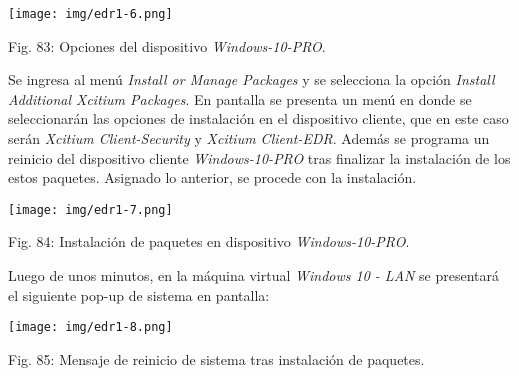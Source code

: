\documentclass[12pt,oneside,a4paper]{book}
\begin{document}
\vspace{2em}

\begin{center}
    \texttt{[image: img/edr1-6.png]}
    
\vspace{0.1em}
    
    Fig. 83: Opciones del dispositivo \textit{Windows-10-PRO}.
\end{center}

\vspace{2em}

\hspace{20pt}
Se ingresa al menú \textit{Install or Manage Packages} y se selecciona la opción \textit{Install Additional Xcitium Packages}. En pantalla se presenta un menú en donde se seleccionarán las opciones de instalación en el dispositivo cliente, que en este caso serán \textit{Xcitium Client-Security} y \textit{Xcitium Client-EDR}. Además se programa un reinicio del dispositivo cliente \textit{Windows-10-PRO} tras finalizar la instalación de los estos paquetes. Asignado lo anterior, se procede con la instalación.

\vspace{2em}

\begin{center}
    \texttt{[image: img/edr1-7.png]}
    
\vspace{0.1em}
    
    Fig. 84: Instalación de paquetes en dispositivo \textit{Windows-10-PRO}.
\end{center}

\vspace{2em}

\hspace{20pt}
Luego de unos minutos, en la máquina virtual \textit{Windows 10 - LAN} se presentará el siguiente pop-up de sistema en pantalla:

\vspace{2em}

\begin{center}
    \texttt{[image: img/edr1-8.png]}
    
\vspace{0.1em}
    
    Fig. 85: Mensaje de reinicio de sistema tras instalación de paquetes.
\end{center}

\vspace{2em}
\end{document}
